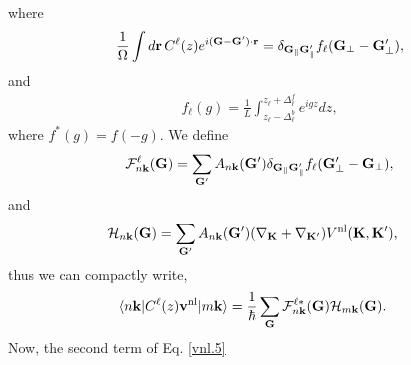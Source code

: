 \documentclass[letterpaper,aps]{revtex4}
\begin{document}
where
\begin{align}\label{vnl.8}
\frac{1}{\Omega}
\int d\mathbf{r}\, 
C^\ell(z) 
e^{i(\mathbf{G}-\mathbf{G}')\cdot\mathbf{r}}
=\delta_{\mathbf{G}_\parallel \mathbf{G}'_\parallel}f_\ell(\mathbf{G}_\perp-\mathbf{G}'_\perp)
,
\end{align} 
and
\begin{align}\label{vnl.9}
f_\ell(g)=\frac{1}{L}\int_{z_\ell-\Delta^b_\ell}^{z_\ell+\Delta^f_\ell} e^{igz}dz  
 ,
\end{align}
where $f^*(g)=f(-g)$.
We define
\begin{align}\label{vnl.10}
{\cal F}^\ell_{n\mathbf{k}}(\mathbf{G}) 
=
\sum_{\mathbf{G}'}
A_{n\mathbf{k}}(\mathbf{G}') 
\delta_{\mathbf{G}_\parallel \mathbf{G}'_\parallel}f_\ell(\mathbf{G}'_\perp-\mathbf{G}_\perp) 
,
\end{align}
and
\begin{align}\label{vnl.11}
{\cal H}_{n\mathbf{k}}(\mathbf{G})&=
\sum_{\mathbf{G}'}
A_{n\mathbf{k}}(\mathbf{G}') 
(\nabla_{\mathbf{K}}+\nabla_{\mathbf{K}'}) 
V^\mathrm{nl}(\mathbf{K},\mathbf{K}') 
,
\end{align}
thus we can compactly write,
\begin{align}\label{vn.12}
\langle n\mathbf{k} |C^\ell(z) 
\mathbf{v}^\mathrm{nl}| m\mathbf{k} \rangle
&=
\frac{1}{\hbar}
\sum_{\mathbf{G}}
{\cal F}^{\ell*}_{n\mathbf{k}}(\mathbf{G}) 
{\cal H}_{m\mathbf{k}}(\mathbf{G}) 
.
\end{align}
Now, the second term of Eq. \eqref{vnl.5}
\end{document}
